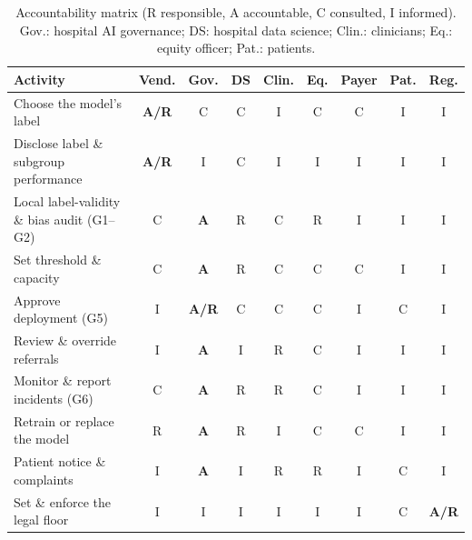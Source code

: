 \begin{table}[t]
\centering
\caption{Accountability matrix (R responsible, A accountable, C consulted, I informed). Gov.: hospital AI governance; DS: hospital data science; Clin.: clinicians; Eq.: equity officer; Pat.: patients.}
\label{tab:raci}
\scriptsize
\setlength{\tabcolsep}{1.6pt}
\begin{tabular}{@{}lcccccccc@{}}
\toprule
Activity & Vend. & Gov. & DS & Clin. & Eq. & Payer & Pat. & Reg. \\
\midrule
Choose the model's label & \textbf{A/R} & C & C & I & C & C & I & I \\
Disclose label \& subgroup performance & \textbf{A/R} & I & C & I & I & I & I & I \\
Local label-validity \& bias audit (G1--G2) & C & \textbf{A} & R & C & R & I & I & I \\
Set threshold \& capacity & C & \textbf{A} & R & C & C & C & I & I \\
Approve deployment (G5) & I & \textbf{A/R} & C & C & C & I & C & I \\
Review \& override referrals & I & \textbf{A} & I & R & C & I & I & I \\
Monitor \& report incidents (G6) & C & \textbf{A} & R & R & C & I & I & I \\
Retrain or replace the model & R & \textbf{A} & R & I & C & C & I & I \\
Patient notice \& complaints & I & \textbf{A} & I & R & R & I & C & I \\
Set \& enforce the legal floor & I & I & I & I & I & I & C & \textbf{A/R} \\
\bottomrule
\end{tabular}
\end{table}
